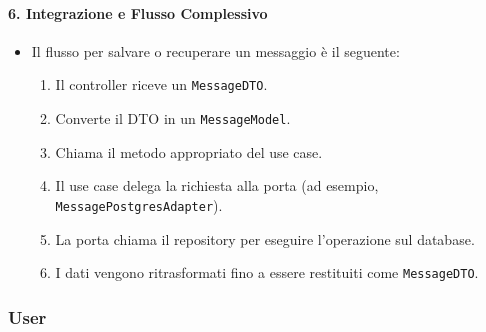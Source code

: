     \paragraph{6. Integrazione e Flusso Complessivo}
    \begin{itemize}
        \item Il flusso per salvare o recuperare un messaggio è il seguente:
        \begin{enumerate}
            \item Il controller riceve un \texttt{MessageDTO}.
            \item Converte il DTO in un \texttt{MessageModel}.
            \item Chiama il metodo appropriato del use case.
            \item Il use case delega la richiesta alla porta (ad esempio, \texttt{MessagePostgresAdapter}).
            \item La porta chiama il repository per eseguire l'operazione sul database.
            \item I dati vengono ritrasformati fino a essere restituiti come \texttt{MessageDTO}.
        \end{enumerate}
    \end{itemize}

    \subsubsection{User}

